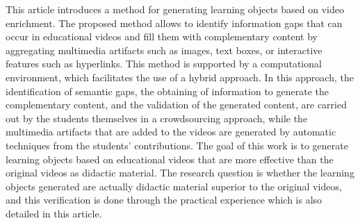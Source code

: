 This article introduces a method for generating learning objects based on video enrichment. The proposed method allows to identify information gaps that can occur in educational videos and fill them with complementary content by aggregating multimedia artifacts such as images, text boxes, or interactive features such as hyperlinks. This method is supported by a computational environment, which facilitates the use of a hybrid approach. In this approach, the identification of semantic gaps, the obtaining of information to generate the complementary content, and the validation of the generated content, are carried out by the students themselves in a crowdsourcing approach, while the multimedia artifacts that are added to the videos are generated by automatic techniques from the students' contributions. The goal of this work is to generate learning objects based on educational videos that are more effective than the original videos as didactic material. The research question is whether the learning objects generated are actually didactic material superior to the original videos, and this verification is done through the practical experience which is also detailed in this article.
